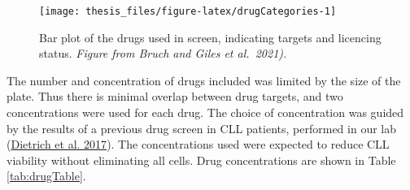 \documentclass[11pt, a4paper, twosided]{book}
\begin{document}
\begin{figure}

{\centering \texttt{[image: thesis\_files/figure-latex/drugCategories-1]} 

}

\caption{Bar plot of the drugs used in screen, indicating targets and licencing status. \emph{Figure from Bruch and Giles et al.~2021).}}\label{fig:drugCategories}
\end{figure}
The number and concentration of drugs included was limited by the size of the plate. Thus there is minimal overlap between drug targets, and two concentrations were used for each drug. The choice of concentration was guided by the results of a previous drug screen in CLL patients, performed in our lab (\protect\hyperlink{ref-JCIpaper}{Dietrich et al. 2017}). The concentrations used were expected to reduce CLL viability without eliminating all cells. Drug concentrations are shown in Table \ref{tab:drugTable}.
\end{document}
